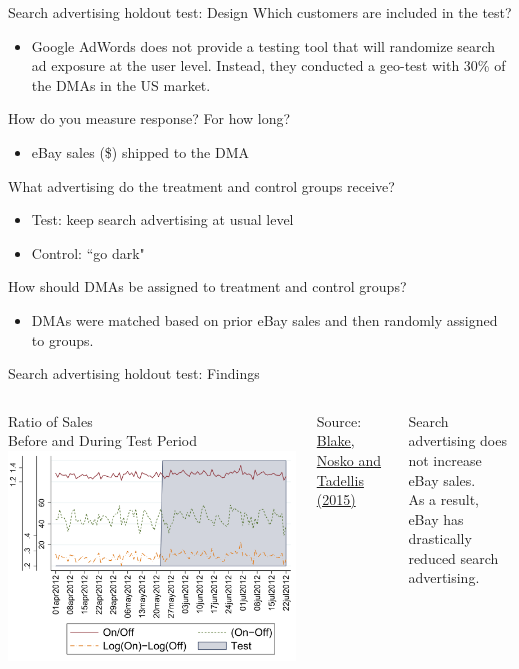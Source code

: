 \documentclass[10pt, aspectratio=169]{beamer}
\newcommand{\source}[1]{\begin{flushright} \footnotesize Source: {#1} \end{flushright} \normalsize}
\begin{document}
\begin{frame}{Search advertising holdout test: Design}
Which customers are included in the test?\\
\begin{itemize}
\item Google AdWords does not provide a testing tool that will randomize search ad exposure at the user level. Instead, they conducted a \alert{geo-test} with 30\% of the DMAs in the US market. 
\end{itemize}
\pause
How do you measure response? For how long?
\begin{itemize}
\item eBay sales (\$) shipped to the DMA
\end{itemize}
\pause
What advertising do the treatment and control groups receive?\\
\begin{itemize}
\item Test: keep search advertising at usual level
\item Control: ``go dark"
\end{itemize}
\pause
How should DMAs be assigned to treatment and control groups? \\
\begin{itemize}
\item DMAs were \alert{matched} based on prior eBay sales and then randomly assigned to groups.
\end{itemize}
\end{frame}

\begin{frame}{Search advertising holdout test: Findings}
\begin{columns}
\centering
Ratio of Sales \\ Before and During Test Period\\
\includegraphics[width=\textwidth]{images/blakeetalresult.png}\\
\source{\href{https://drive.google.com/uc?export=download&id=0B0EzanlzLNsWU1BkWnFxZlZuZUE}{Blake, Nosko and Tadellis (2015)}}
\alert{Search advertising does not increase eBay sales. \\ As a result, eBay has drastically reduced search advertising.}
\end{columns}
\end{frame}
\end{document}
